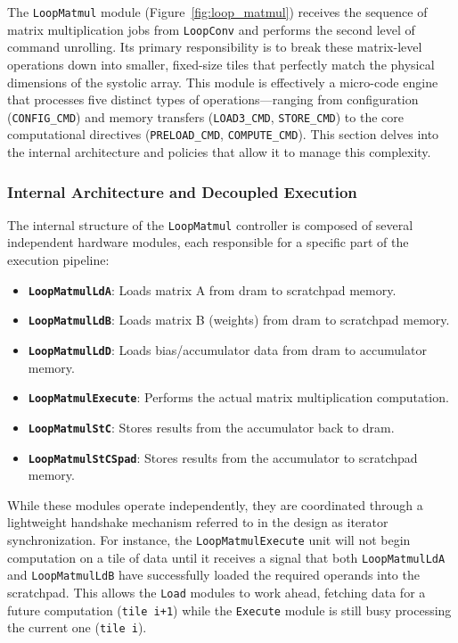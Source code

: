 The \texttt{LoopMatmul} module (Figure~\ref{fig:loop_matmul}) receives the sequence of matrix multiplication jobs from \texttt{LoopConv} and performs the second level of command unrolling. Its primary responsibility is to break these matrix-level operations down into smaller, fixed-size tiles that perfectly match the physical dimensions of the systolic array. This module is effectively a micro-code engine that processes five distinct types of operations—ranging from configuration (\texttt{CONFIG\_CMD}) and memory transfers (\texttt{LOAD3\_CMD}, \texttt{STORE\_CMD}) to the core computational directives (\texttt{PRELOAD\_CMD}, \texttt{COMPUTE\_CMD}). This section delves into the internal architecture and policies that allow it to manage this complexity.

\subsubsection{Internal Architecture and Decoupled Execution}

The internal structure of the \texttt{LoopMatmul} controller is composed of several independent hardware modules, each responsible for a specific part of the execution pipeline:
\begin{itemize}
    \item \textbf{\texttt{LoopMatmulLdA}}: Loads matrix A from \acrshort{dram} to scratchpad memory.
    \item \textbf{\texttt{LoopMatmulLdB}}: Loads matrix B (weights) from \acrshort{dram} to scratchpad memory.
    \item \textbf{\texttt{LoopMatmulLdD}}: Loads bias/accumulator data from \acrshort{dram} to accumulator memory.
    \item \textbf{\texttt{LoopMatmulExecute}}: Performs the actual matrix multiplication computation.
    \item \textbf{\texttt{LoopMatmulStC}}: Stores results from the accumulator back to \acrshort{dram}.
    \item \textbf{\texttt{LoopMatmulStCSpad}}: Stores results from the accumulator to scratchpad memory.
\end{itemize}

While these modules operate independently, they are coordinated through a lightweight handshake mechanism referred to in the design as iterator synchronization. For instance, the \texttt{LoopMatmulExecute} unit will not begin computation on a tile of data until it receives a signal that both \texttt{LoopMatmulLdA} and \texttt{LoopMatmulLdB} have successfully loaded the required operands into the scratchpad. This allows the \texttt{Load} modules to work ahead, fetching data for a future computation (\texttt{tile i+1}) while the \texttt{Execute} module is still busy processing the current one (\texttt{tile i}).

